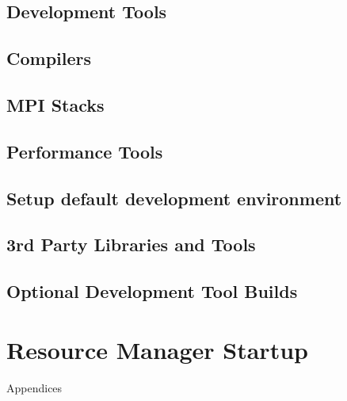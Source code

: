 \documentclass[letterpaper]{article}
\begin{document}
\subsection{Development Tools} \label{sec:install_dev_tools}


\vspace*{-0.15cm}
\subsection{Compilers} \label{sec:install_compilers}


\subsection{MPI Stacks} \label{sec:mpi}


\subsection{Performance Tools} \label{sec:install_perf_tools}


\subsection{Setup default development environment}


\subsection{3rd Party Libraries and Tools} \label{sec:3rdparty}





\vspace*{.6cm}
\subsection{Optional Development Tool Builds} \label{sec:3rdparty_intel}


\section{Resource Manager Startup} \label{sec:rms_startup}


\clearpage
\appendix
{\bf \LARGE \centerline{Appendices}} \vspace*{0.2cm}

\renewcommand{\thesubsection}{\Alph{subsection}}






\end{document}
